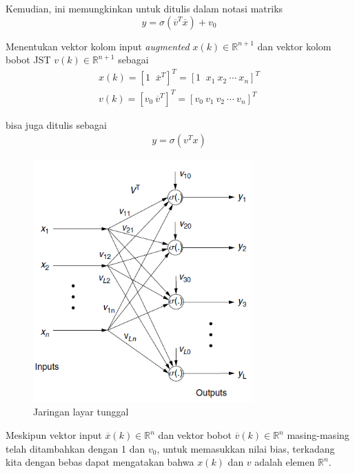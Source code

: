 Kemudian, ini memungkinkan untuk ditulis dalam notasi matriks
\vspace{-1em}
\begin{equation} \label{eq:3:matriksy}
y = \sigma(\overline{v}^T\overline{x}) + v_0
\end{equation}

Menentukan vektor kolom input \textit{augmented} $x(k) \in \mathbb{R}^{n+1} $ dan vektor kolom bobot JST $v(k) \in \mathbb{R}^{n+1} $ sebagai
\vspace{-1em}
\begin{equation} \label{eq:3:matriksaugmented}
\begin{split}
x(k) = [1\;\; \overline{x}^T]^T = [1\;\; x_1\ x_2\ \cdots\ x_n]^T \\
v(k) = [v_0\ \overline{v}^T]^T = [v_0\ v_1\ v_2\ \cdots\ v_n]^T
\end{split}
\end{equation}

bisa juga ditulis sebagai
\vspace{-2em}
\begin{equation} \label{eq:3:matriksfinal}
\begin{split}
y = \sigma(v^Tx)
\end{split}
\end{equation}

\begin{figure}[!h]
	\centering
	\includegraphics[width=0.75\textwidth]{figures/jstTunggal}
	\caption{Jaringan layar tunggal}
	\label{fig:3:jstTunggal}
\end{figure}
Meskipun vektor input $\overline{x}(k) \in \mathbb{R}^n $ dan vektor bobot $\overline{v}(k) \in \mathbb{R}^n $ masing-masing telah ditambahkan dengan 1 dan $v_0$, untuk memasukkan nilai bias, terkadang kita dengan bebas dapat mengatakan bahwa $x(k)$ dan $v$ adalah elemen $\mathbb{R}^n$.\\

